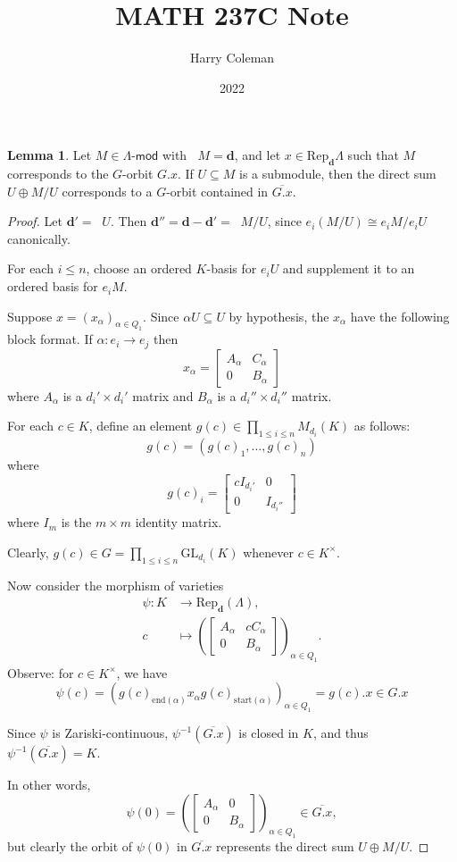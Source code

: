 \documentclass[12pt]{article}
\renewcommand{\maketitle}{\thispagestyle{title}}
\theoremstyle{definition}
\newtheorem{lemma}{Lemma}
\newcommand{\<}{\langle}
\renewcommand{\>}{\rangle}
\newcommand{\iso}{\cong}
\newcommand{\clo}{\overline}
\newcommand{\seq}{\subseteq}
\newcommand{\dd}{\mathrm{d}}
\newcommand{\mat}[1]{\begin{bmatrix}#1\end{bmatrix}}
\renewcommand{\mod}{\text{-}\mathsf{mod}}
\newcommand{\Rep}{\mathrm{Rep}}
\newcommand{\GL}{\mathrm{GL}}
\newcommand{\udl}{\underline}
\DeclareMathOperator{\Dim}{\udl{dim}}
\renewcommand{\dd}{\mathbf{d}}
\begin{document}
\title{MATH 237C Note}
\author{Harry Coleman}
\date{2022}
\maketitle

\begin{lemma}
    Let $M \in \Lambda\mod$ with $\Dim M = \dd$, and let $x \in \Rep_\dd\Lambda$ such that $M$ corresponds to the $G$-orbit $G.x$.
    If $U \seq M$ is a submodule, then the direct sum $U \oplus M/U$ corresponds to a $G$-orbit contained in $\clo{G.x}$.
\end{lemma}

\begin{proof}
    Let $\dd' = \Dim U$.
    Then $\dd'' = \dd - \dd' = \Dim M/U$, since $e_i(M / U) \iso e_i M / e_i U$ canonically.

    For each $i \leq n$, choose an ordered $K$-basis for $e_i U$ and supplement it to an ordered basis for $e_i M$.

    Suppose $x = (x_\alpha)_{\alpha \in Q_1}$.
    Since $\alpha U \seq U$ by hypothesis, the $x_\alpha$ have the following block format.
    If $\alpha : e_i \to e_j$ then
    \[
        x_\alpha = \mat{A_\alpha & C_\alpha \\ 0 & B_\alpha}
    \]
    where $A_\alpha$ is a $d_i' \times d_i'$ matrix and $B_\alpha$ is a $d_i'' \times d_i''$ matrix.

    For each $c \in K$, define an element $g(c) \in \prod_{1 \leq i \leq n} M_{d_i}(K)$ as follows:
    \[
        g(c) = (g(c)_1, \dots, g(c)_n)
    \]
    where
    \[
        g(c)_i = \mat{cI_{d_i'} & 0 \\ 0 & I_{d_i''}}
    \]
    where $I_m$ is the $m \times m$ identity matrix.

    Clearly, $g(c) \in G = \prod_{1 \leq i \leq n} \GL_{d_i}(K)$ whenever $c \in K^\times$.

    Now consider the morphism of varieties
    \begin{align*}
        \psi : K &\longrightarrow \Rep_\dd(\Lambda), \\
            c &\longmapsto \left(\mat{A_\alpha & cC_\alpha \\ 0 & B_\alpha}\right)_{\alpha \in Q_1}.
    \end{align*}
    Observe: for $c \in K^\times$, we have
    \[
        \psi(c)
            = \left(g(c)_{\mathrm{end}(\alpha)} x_\alpha g(c)_{\mathrm{start}(\alpha)}\right)_{\alpha \in Q_1}
            = g(c).x
            \in G.x
    \]

    Since $\psi$ is Zariski-continuous, $\psi^{-1}(\clo{G.x})$ is closed in $K$, and thus $\psi^{-1}(\clo{G.x}) = K$.

    In other words,
    \[
        \psi(0)
            = \left(\mat{A_\alpha & 0 \\ 0 & B_\alpha}\right)_{\alpha \in Q_1} 
            \in \clo{G.x},
    \]
    but clearly the orbit of $\psi(0)$ in $\clo{G.x}$ represents the direct sum $U \oplus M/U$.

\end{proof}
\end{document}
